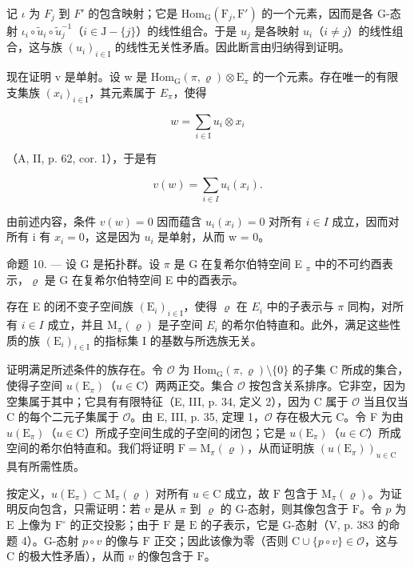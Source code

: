 记 \(\iota\) 为 \(F_{j}\) 到 \(F'\) 的包含映射；它是 \(\mathrm{Hom}_{\mathrm{G}}(\mathrm{F}_{j}, \mathrm{F}')\) 的一个元素，因而是各 G-态射 \(\iota_{i} \circ \widetilde{u}_{i} \circ \widetilde{u}_{j}^{-1}\)（\(i \in \mathrm{J} - \{j\}\)）的线性组合。于是 \(u_{j}\) 是各映射 \(u_{i}\)（\(i \neq j\)）的线性组合，这与族 \((u_{i})_{i \in \mathrm{I}}\) 的线性无关性矛盾。因此断言由归纳得到证明。

现在证明 v 是单射。设 w 是 \(\mathrm{Hom}_{\mathrm{G}}(\pi,\varrho)\otimes\mathrm{E}_{\pi}\) 的一个元素。存在唯一的有限支集族 \((x_{i})_{i\in\mathrm{I}}\)，其元素属于 \(E_{\pi}\)，使得

\[
w = \sum_ {i \in \mathrm{I}} u _ {i} \otimes x _ {i}
\]

（A, II, p. 62, cor. 1），于是有

\[
v (w) = \sum_ {i \in I} u _ {i} (x _ {i}).
\]

由前述内容，条件 \(v(w) = 0\) 因而蕴含 \(u_{i}(x_{i}) = 0\) 对所有 \(i \in I\) 成立，因而对所有 i 有 \(x_{i} = 0\)，这是因为 \(u_{i}\) 是单射，从而 w = 0。

命题 10. --- 设 G 是拓扑群。设 \(\pi\) 是 G 在复希尔伯特空间 E \(_{\pi}\) 中的不可约酉表示，\(\varrho\) 是 G 在复希尔伯特空间 E 中的酉表示。

存在 E 的闭不变子空间族 \((\mathrm{E}_{i})_{i\in\mathrm{I}}\)，使得 \(\varrho\) 在 \(E_{i}\) 中的子表示与 \(\pi\) 同构，对所有 \(i\in I\) 成立，并且 \(\mathrm{M}_{\pi}(\varrho)\) 是子空间 \(E_{i}\) 的希尔伯特直和。此外，满足这些性质的族 \((\mathrm{E}_{i})_{i\in\mathrm{I}}\) 的指标集 I 的基数与所选族无关。

证明满足所述条件的族存在。令 \(\mathcal{O}\) 为 \(\mathrm{Hom}_{\mathrm{G}}(\pi, \varrho)\setminus\{0\}\) 的子集 C 所成的集合，使得子空间 \(u(\mathrm{E}_{\pi})\)（\(u \in \mathrm{C}\)）两两正交。集合 \(\mathcal{O}\) 按包含关系排序。它非空，因为空集属于其中；它具有有限特征（E, III, p. 34, 定义 2），因为 C 属于 \(\mathcal{O}\) 当且仅当 C 的每个二元子集属于 \(\mathcal{O}\)。由 E, III, p. 35, 定理 1，\(\mathcal{O}\) 存在极大元 C。令 F 为由 \(u(\mathrm{E}_{\pi})\)（\(u \in \mathrm{C}\)）所成子空间生成的子空间的闭包；它是 \(u(\mathrm{E}_{\pi})\)（\(u \in C\)）所成空间的希尔伯特直和。我们将证明 \(\mathrm{F} = \mathrm{M}_{\pi}(\varrho)\)，从而证明族 \((u(\mathrm{E}_{\pi}))_{u \in \mathrm{C}}\) 具有所需性质。

按定义，\(u(\mathrm{E}_{\pi}) \subset \mathrm{M}_{\pi}(\varrho)\) 对所有 \(u \in \mathrm{C}\) 成立，故 \(\mathrm{F}\) 包含于 \(\mathrm{M}_{\pi}(\varrho)\)。为证明反向包含，只需证明：若 \(v\) 是从 \(\pi\) 到 \(\varrho\) 的 G-态射，则其像包含于 \(\mathrm{F}\)。令 \(p\) 为 \(\mathrm{E}\) 上像为 \(\mathrm{F}^{\circ}\) 的正交投影；由于 \(\mathrm{F}\) 是 \(\mathrm{E}\) 的子表示，它是 G-态射（V, p. 383 的命题 4）。G-态射 \(p \circ v\) 的像与 \(\mathrm{F}\) 正交；因此该像为零（否则 \(\mathrm{C} \cup \{p \circ v\} \in \mathcal{O}\)，这与 \(\mathrm{C}\) 的极大性矛盾），从而 \(v\) 的像包含于 \(\mathrm{F}\)。

